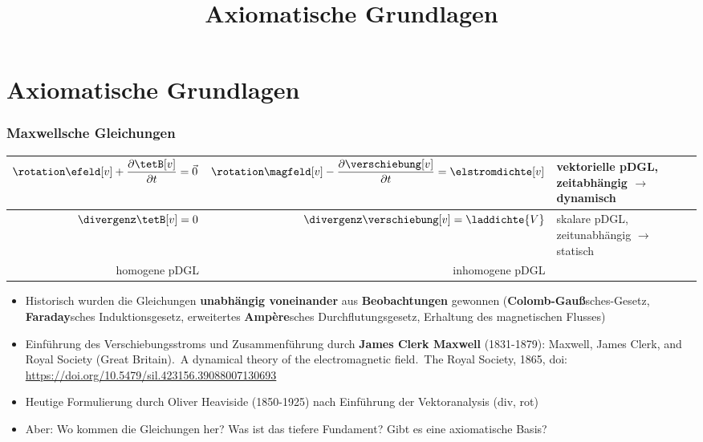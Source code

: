 
\usepackage{tabu}
\usepackage[absolute,overlay]{textpos}

\title[TET: Axiomatische Grundlagen]{Axiomatische Grundlagen}


\maketitle

\section{Axiomatische Grundlagen}

\begin{frame}
  \frametitle{Maxwellsche Gleichungen}
{\tabulinesep=1.2mm
  \begin{tabu}{r|rl}
    \(\rotation\efeld[v] + \dfrac{\partial \tetB[v]}{\partial t} = \vec{0} \) & \(\rotation \magfeld[v] -\dfrac{\partial \verschiebung[v]}{\partial t} = \elstromdichte[v] \) & vektorielle pDGL, zeitabhängig \(\to\) dynamisch \\
\hline
    \( \divergenz\tetB[v] = 0 \) & \( \divergenz \verschiebung[v] =\laddichte{V}\) & skalare pDGL, zeitunabhängig \(\to\) statisch\\
    homogene pDGL & inhomogene pDGL & 
    \end{tabu}}
  
\begin{itemize}[<+->]
\item Historisch wurden die Gleichungen \textbf{unabhängig voneinander} aus \textbf{Beobachtungen} gewonnen (\textbf{Colomb-Gauß}sches-Gesetz, \textbf{Faraday}sches Induktionsgesetz, erweitertes \textbf{Ampère}sches Durchflutungsgesetz, Erhaltung des magnetischen Flusses) 
\item Einführung des Verschiebungsstroms und Zusammenführung durch \textbf{James Clerk Maxwell} (1831-1879): {\tiny Maxwell, James Clerk, and Royal Society (Great Britain). A dynamical theory of the electromagnetic field. The Royal Society, 1865, doi: \url{https://doi.org/10.5479/sil.423156.39088007130693}}
\item Heutige Formulierung durch Oliver Heaviside (1850-1925) nach Einführung der Vektoranalysis (div, rot)
\item Aber: Wo kommen die Gleichungen her? Was ist das tiefere Fundament? Gibt es eine axiomatische Basis?
\end{itemize}
\end{frame}

